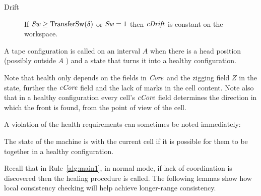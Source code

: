 \documentclass[12pt]{memoir}
\renewcommand{\ge}{\geq}
\newcommand{\fld}[1]{\ensuremath{\textit{#1\/}}}
\newcommand{\Z}{Z}
\newcommand{\Core}{\fld{Core}}
\newcommand{\cCore}{\fld{cCore}}
\newcommand{\cDrift}{\fld{cDrift}}
\newcommand{\cInfo}{\fld{cInfo}}
\newcommand{\cState}{\fld{cState}}
\newcommand{\Sweep}{\fld{Sw}}
\newcommand{\TransferSw}{\mathrm{TransferSw}}
\begin{document}
\begin{definition}
\begin{description}





        \item[Drift]%
         If \( \Sweep \ge \TransferSw(\delta) \) or \( \Sweep=1 \) then \( \cDrift \)
         is constant on the workspace.

   \end{description}

A tape configuration is called  on an interval \( A \)
when there is a head position (possibly outside \( A \) ) and a 
state that turns it into a healthy configuration.
 \end{definition}

Note that health only depends on the fields in \( \Core \) and
the zigging field \( \Z \) in the state, further the  \( \cCore \) field
and the lack of marks in the cell content.
Note also that in a healthy configuration every cell's \( \cCore \) field
determines the direction in which the front is found, from the point of
view of the cell.

A violation of the health requirements can sometimes be noted immediately:

\begin{definition}[Coordination] \label{def:coordinated}
   The state of the machine is  with the current cell
   if it is possible for them to be together in a healthy configuration.
\end{definition}

Recall that in Rule~\ref{alg:main1}, in normal mode,
if lack of coordination is discovered then the healing procedure is called.
The following lemmas show 
how local consistency checking will help achieve longer-range consistency.
\end{document}
